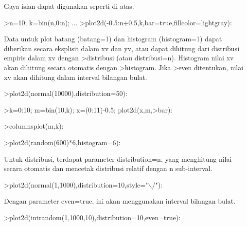\documentclass{article}
\begin{document}
\begin{eulernotebook}
\begin{eulercomment}
\begin{eulercomment}
\begin{eulercomment}
\begin{eulercomment}
\begin{eulercomment}
\begin{eulercomment}
\begin{eulercomment}
\begin{eulercomment}
\begin{eulercomment}
\begin{eulercomment}
\begin{eulercomment}
\begin{eulercomment}
\begin{eulercomment}
Gaya isian dapat digunakan seperti di atas.
\end{eulercomment}
\begin{eulerprompt}
>n=10; k=bin(n,0:n); ...
>plot2d(-0.5:n+0.5,k,bar=true,fillcolor=lightgray):
\end{eulerprompt}
\begin{eulercomment}
Data untuk plot batang (batang=1) dan histogram (histogram=1) dapat
diberikan secara eksplisit dalam xv dan yv, atau dapat dihitung dari
distribusi empiris dalam xv dengan \textgreater{}distribusi (atau distribusi=n).
Histogram nilai xv akan dihitung secara otomatis dengan \textgreater{}histogram.
Jika \textgreater{}even ditentukan, nilai xv akan dihitung dalam interval bilangan
bulat.
\end{eulercomment}
\begin{eulerprompt}
>plot2d(normal(10000),distribution=50):
\end{eulerprompt}
\begin{eulerprompt}
>k=0:10; m=bin(10,k); x=(0:11)-0.5; plot2d(x,m,>bar):
\end{eulerprompt}
\begin{eulerprompt}
>columnsplot(m,k):
\end{eulerprompt}
\begin{eulerprompt}
>plot2d(random(600)*6,histogram=6):
\end{eulerprompt}
\begin{eulercomment}
Untuk distribusi, terdapat parameter distribution=n, yang menghitung
nilai secara otomatis dan mencetak distribusi relatif dengan n
sub-interval.
\end{eulercomment}
\begin{eulerprompt}
>plot2d(normal(1,1000),distribution=10,style="\(\backslash\)/"):
\end{eulerprompt}
\begin{eulercomment}
Dengan parameter even=true, ini akan menggunakan interval bilangan
bulat.
\end{eulercomment}
\begin{eulerprompt}
>plot2d(intrandom(1,1000,10),distribution=10,even=true):
\end{eulerprompt}

\end{eulercomment}
\end{eulercomment}
\end{eulercomment}
\end{eulercomment}
\end{eulercomment}
\end{eulercomment}
\end{eulercomment}
\end{eulercomment}
\end{eulercomment}
\end{eulercomment}
\end{eulercomment}
\end{eulercomment}
\end{eulernotebook}
\end{document}
